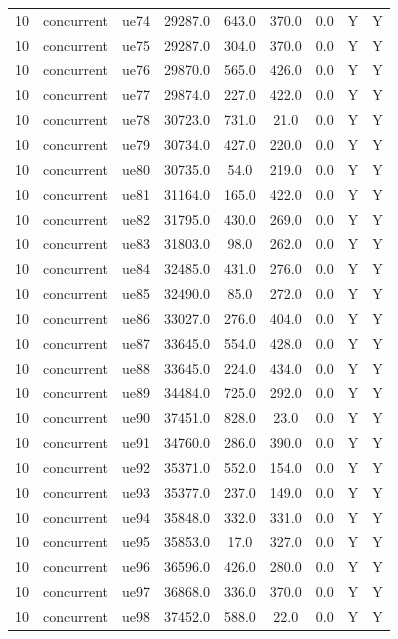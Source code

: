 \begin{table}[ht]
\begin{tabular}{|c|c|c|c|c|c|c|c|c|}
10 & concurrent & ue74 & 29287.0 & 643.0 & 370.0 & 0.0 & Y & Y \\
10 & concurrent & ue75 & 29287.0 & 304.0 & 370.0 & 0.0 & Y & Y \\
10 & concurrent & ue76 & 29870.0 & 565.0 & 426.0 & 0.0 & Y & Y \\
10 & concurrent & ue77 & 29874.0 & 227.0 & 422.0 & 0.0 & Y & Y \\
10 & concurrent & ue78 & 30723.0 & 731.0 & 21.0 & 0.0 & Y & Y \\
10 & concurrent & ue79 & 30734.0 & 427.0 & 220.0 & 0.0 & Y & Y \\
10 & concurrent & ue80 & 30735.0 & 54.0 & 219.0 & 0.0 & Y & Y \\
10 & concurrent & ue81 & 31164.0 & 165.0 & 422.0 & 0.0 & Y & Y \\
10 & concurrent & ue82 & 31795.0 & 430.0 & 269.0 & 0.0 & Y & Y \\
10 & concurrent & ue83 & 31803.0 & 98.0 & 262.0 & 0.0 & Y & Y \\
10 & concurrent & ue84 & 32485.0 & 431.0 & 276.0 & 0.0 & Y & Y \\
10 & concurrent & ue85 & 32490.0 & 85.0 & 272.0 & 0.0 & Y & Y \\
10 & concurrent & ue86 & 33027.0 & 276.0 & 404.0 & 0.0 & Y & Y \\
10 & concurrent & ue87 & 33645.0 & 554.0 & 428.0 & 0.0 & Y & Y \\
10 & concurrent & ue88 & 33645.0 & 224.0 & 434.0 & 0.0 & Y & Y \\
10 & concurrent & ue89 & 34484.0 & 725.0 & 292.0 & 0.0 & Y & Y \\
10 & concurrent & ue90 & 37451.0 & 828.0 & 23.0 & 0.0 & Y & Y \\
10 & concurrent & ue91 & 34760.0 & 286.0 & 390.0 & 0.0 & Y & Y \\
10 & concurrent & ue92 & 35371.0 & 552.0 & 154.0 & 0.0 & Y & Y \\
10 & concurrent & ue93 & 35377.0 & 237.0 & 149.0 & 0.0 & Y & Y \\
10 & concurrent & ue94 & 35848.0 & 332.0 & 331.0 & 0.0 & Y & Y \\
10 & concurrent & ue95 & 35853.0 & 17.0 & 327.0 & 0.0 & Y & Y \\
10 & concurrent & ue96 & 36596.0 & 426.0 & 280.0 & 0.0 & Y & Y \\
10 & concurrent & ue97 & 36868.0 & 336.0 & 370.0 & 0.0 & Y & Y \\
10 & concurrent & ue98 & 37452.0 & 588.0 & 22.0 & 0.0 & Y & Y \\

\end{tabular}
\end{table}
